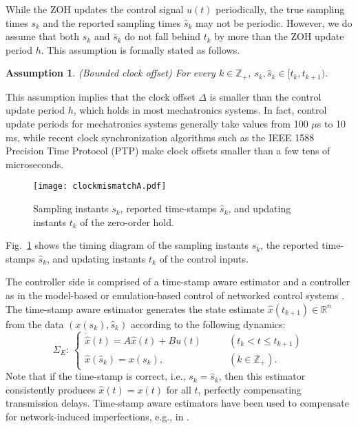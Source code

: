 \documentclass[letterpaper, 12pt, draftcls, onecolumn]{ieeeconf}
\newtheorem{assumption}[theorem]{Assumption}
\begin{document}
While the ZOH updates the control signal $u(t)$ periodically, 
the true sampling times $s_k$ and the reported sampling times 
$\hat s_k$ may not be periodic. 
However, we do assume that both $s_k$ and $\hat s_k$ do not fall 
behind $t_k$ by more than the ZOH update period $h$.
This assumption is formally stated as follows.
\begin{assumption}
	\label{ass:sample}
	{\em(}Bounded clock offset{\em)}
	{\em
For every $k \in \mathbb{Z}_+$,
$s_k, \hat s_k \in[ t_{k}, t_{k+1})$. 
	}
\end{assumption}
This assumption implies that
the clock offset $\Delta$ is smaller than the control update period $h$,
which holds 
in most mechatronics systems. In fact,
control update periods 
for mechatronics systems
generally take values from 100 $\mu$s to 10 ms,
while
recent clock
synchronization algorithms such as the IEEE 1588 Precision Time Protocol (PTP)
\cite{PTP}
make clock offsets smaller than a few tens of microseconds.


\begin{figure}[tb]
	\centering
	\texttt{[image: clockmismatchA.pdf]}
	\caption{Sampling instants $s_k$, reported time-stamps $\hat s_k$, 
		and updating instants $t_k$ of the zero-order hold.}
	\label{fig:clockmismatch}
\end{figure}


Fig.~\ref{fig:clockmismatch} shows the timing diagram
of the sampling instants $s_k$,
the reported time-stamps $\hat s_k$, 
and updating instants $t_k$ of the control inputs.

The controller side is comprised of a time-stamp aware estimator and a
controller
as in the model-based or emulation-based control of 
networked control systems \cite{Garcia2014}.
The time-stamp aware estimator generates 
the state estimate $\hat{x}(t_{k+1}) \in \mathbb{R}^n$
from the data $(x(s_k), \hat s_k)$ according to the following dynamics:
\begin{equation}
\label{eq:estimator}
\Sigma_E:~
\begin{cases}
\dot{\hat x}(t) = A\hat{x}(t) + Bu(t)
&\qquad(t_k < t \leq t_{k+1})	 \\
\hat{x}(\hat s_k) = x(s_k),
&\qquad(k \in \mathbb{Z}_+).
\end{cases}
\end{equation} 
Note that if the time-stamp is correct, i.e., 
$s_k=\hat s_k$, then this estimator consistently produces 
$\hat x(t) = x(t)$ for all $t$, perfectly compensating
transmission delays.
Time-stamp aware estimators have been used to compensate for
network-induced imperfections, e.g., in \cite{Graham2004,Nakamura2008,Garcia2014}.
\end{document}
